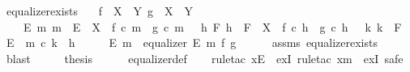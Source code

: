 \begin{isabellebody}
\isanewline
{}\isamarkupfalse%
\ equalizer{\isacharunderscore}{\kern0pt}exists{}{\isacharcolon}{\kern0pt}\isanewline
\ \ \ {\isachardoublequoteopen}f\ {\isacharcolon}{\kern0pt}\ X\ {\isasymrightarrow}\ Y{\isachardoublequoteclose}\ {\isachardoublequoteopen}g\ {\isacharcolon}{\kern0pt}\ X\ {\isasymrightarrow}\ Y{\isachardoublequoteclose}\isanewline
\ \ \ {\isachardoublequoteopen}{\isasymexists}\ E\ m{\isachardot}{\kern0pt}\ m\ {\isacharcolon}{\kern0pt}\ E\ {\isasymrightarrow}\ X\ {\isasymand}\ f\ {\isasymcirc}\isactrlsub c\ m\ {\isacharequal}{\kern0pt}\ g\ {\isasymcirc}\isactrlsub c\ m\ {\isasymand}\ {\isacharparenleft}{\kern0pt}{\isasymforall}\ h\ F{\isachardot}{\kern0pt}\ {\isacharparenleft}{\kern0pt}{\isacharparenleft}{\kern0pt}h\ {\isacharcolon}{\kern0pt}\ F\ {\isasymrightarrow}\ X{\isacharparenright}{\kern0pt}\ {\isasymand}\ {\isacharparenleft}{\kern0pt}f\ {\isasymcirc}\isactrlsub c\ h\ {\isacharequal}{\kern0pt}\ g\ {\isasymcirc}\isactrlsub c\ h{\isacharparenright}{\kern0pt}{\isacharparenright}{\kern0pt}\ {\isasymlongrightarrow}\ {\isacharparenleft}{\kern0pt}{\isasymexists}{\isacharbang}{\kern0pt}\ k{\isachardot}{\kern0pt}\ {\isacharparenleft}{\kern0pt}k\ {\isacharcolon}{\kern0pt}\ F\ {\isasymrightarrow}\ E{\isacharparenright}{\kern0pt}\ {\isasymand}\ m\ {\isasymcirc}\isactrlsub c\ k\ {\isacharequal}{\kern0pt}\ h{\isacharparenright}{\kern0pt}{\isacharparenright}{\kern0pt}{\isachardoublequoteclose}\isanewline
%
\isadelimproof
%
\endisadelimproof
%
\isatagproof
{}\isamarkupfalse%
\ {\isacharminus}{\kern0pt}\isanewline
\ \ \isamarkupfalse%
\ E\ m\ \ {\isachardoublequoteopen}equalizer\ E\ m\ f\ g{\isachardoublequoteclose}\isanewline
\ \ \ \ \isamarkupfalse%
\ assms\ equalizer{\isacharunderscore}{\kern0pt}exists\ \isamarkupfalse%
\ blast\isanewline
\ \ \isamarkupfalse%
\ \isamarkupfalse%
\ {\isacharquery}{\kern0pt}thesis\isanewline
\ \ \ \ \isamarkupfalse%
\ equalizer{\isacharunderscore}{\kern0pt}def\isanewline
\ \ \isamarkupfalse%
\ {\isacharparenleft}{\kern0pt}rule{\isacharunderscore}{\kern0pt}tac\ x{\isacharequal}{\kern0pt}{\isachardoublequoteopen}E{\isachardoublequoteclose}\ \ exI{\isacharcomma}{\kern0pt}\ rule{\isacharunderscore}{\kern0pt}tac\ x{\isacharequal}{\kern0pt}{\isachardoublequoteopen}m{\isachardoublequoteclose}\ \ exI{\isacharcomma}{\kern0pt}\ safe{\isacharparenright}{\kern0pt}\isanewline
\ \ \ \ \isamarkupfalse%

\end{isabellebody}
